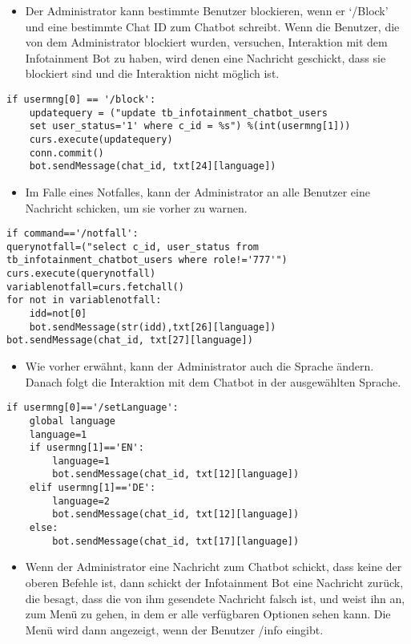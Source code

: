\begin{itemize}
	\item Der Administrator kann bestimmte Benutzer blockieren, wenn er ‘/Block’ und eine bestimmte Chat ID zum Chatbot schreibt. Wenn die Benutzer, die von dem Administrator blockiert wurden, versuchen, Interaktion mit dem Infotainment Bot zu haben, wird denen eine Nachricht geschickt, dass sie blockiert sind und die Interaktion nicht m\"oglich ist.
\end{itemize}
\begin{lstlisting}[frame=single]
if usermng[0] == '/block':
	updatequery = ("update tb_infotainment_chatbot_users 
	set user_status='1' where c_id = %s") %(int(usermng[1]))
	curs.execute(updatequery)
	conn.commit()
	bot.sendMessage(chat_id, txt[24][language])
\end{lstlisting}
\begin{itemize}
	\item Im Falle eines Notfalles, kann der Administrator an alle Benutzer eine Nachricht schicken, um sie vorher zu warnen.   
\end{itemize}
\begin{lstlisting}[frame=single]
if command=='/notfall':
querynotfall=("select c_id, user_status from tb_infotainment_chatbot_users where role!='777'")
curs.execute(querynotfall)
variablenotfall=curs.fetchall()
for not in variablenotfall:
	idd=not[0]
	bot.sendMessage(str(idd),txt[26][language])
bot.sendMessage(chat_id, txt[27][language])
\end{lstlisting}
\begin{itemize}
	\item Wie vorher erw\"ahnt, kann der Administrator auch die Sprache \"andern. Danach folgt die Interaktion mit dem Chatbot in der ausgew\"ahlten Sprache.   
\end{itemize}
\begin{lstlisting}[frame=single]
if usermng[0]=='/setLanguage':
	global language
	language=1
	if usermng[1]=='EN':
		language=1
		bot.sendMessage(chat_id, txt[12][language])
	elif usermng[1]=='DE':
		language=2
		bot.sendMessage(chat_id, txt[12][language])
	else:
		bot.sendMessage(chat_id, txt[17][language])
\end{lstlisting}
\begin{itemize}
	\item Wenn der Administrator eine Nachricht zum Chatbot schickt, dass keine der oberen Befehle ist, dann schickt der Infotainment Bot eine Nachricht zur\"uck, die besagt, dass die von ihm gesendete Nachricht falsch ist, und weist ihn an, zum Menü zu gehen, in dem er alle verfügbaren Optionen sehen kann. Die Men\"u wird dann angezeigt, wenn der Benutzer /info eingibt.
\end{itemize}
